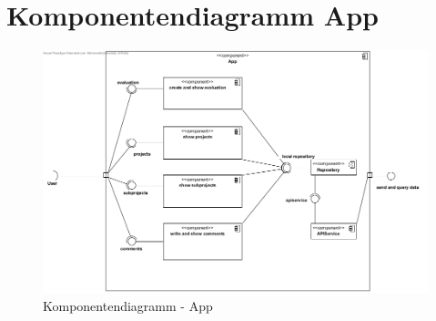 \section{Komponentendiagramm App}

\begin{figure}[H]
	\centering
	\includegraphics[width=\textwidth]{img/componentapp.png}	
	\caption{Komponentendiagramm - App}
	\label{fig:komponentendiagramm-b}
\end{figure}


